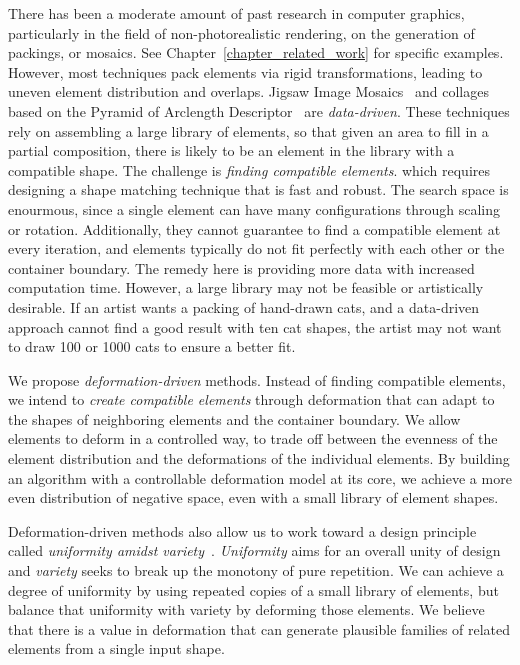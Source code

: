 There has been a moderate amount of past research in computer
graphics, particularly in the field of non-photorealistic rendering,
on the generation of packings, or mosaics.  
See Chapter~\ref{chapter_related_work} for specific examples.  
However,  most techniques pack elements via rigid transformations, leading to
uneven element distribution and overlaps.  
Jigsaw Image Mosaics~\cite{Kim2002} and collages based on the Pyramid of Arclength
Descriptor~\cite{Kwan2016} are \textit{data-driven}.
These techniques rely on assembling a large library of elements, so that given an
area to fill in a partial composition, there is likely to be an
element in the library with a compatible shape.  The challenge is 
\textit{finding compatible elements}. 
which requires designing a shape matching technique that is fast and robust.
The search space is enourmous, since a single element
can have many configurations through scaling or rotation.
Additionally, they cannot guarantee to find a compatible element
at every iteration, and
elements typically do not fit perfectly with each other 
or the container boundary.
The remedy here is providing more data with increased computation time.
However, a large library may not be feasible or artistically desirable.
If an artist wants a packing of hand-drawn cats, and a data-driven approach 
cannot find a good result with ten cat shapes, 
the artist may not want to draw 100 or 1000 cats to ensure a better fit.

We propose \textit{deformation-driven} methods.
Instead of finding compatible elements,
we intend to \textit{create compatible elements} through deformation
that can adapt to the shapes of neighboring elements and the container boundary.
We allow elements to deform in a controlled way,
to trade off between the evenness of the element distribution and 
the deformations of the individual elements.
By building an algorithm with a controllable deformation model at its core, we achieve a
more even distribution of negative space, even with a small library of element shapes.

Deformation-driven methods also allow us to work toward a design principle called \textit{uniformity amidst variety}~\cite{Hutcheson1729, Gombrich}. 
\textit{Uniformity} aims for an overall unity of design and 
\textit{variety} seeks to break up the monotony of pure repetition.
We can achieve a degree of uniformity by using repeated copies of a small library of elements, but balance that uniformity with
variety by deforming those elements. 
We believe that there is a value in deformation that can generate plausible families of related elements from a single input shape.

